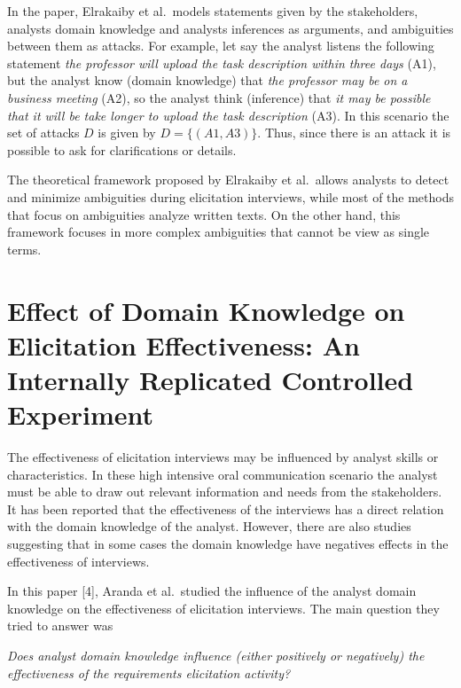 \documentclass[]{llncs}
\begin{document}
In the paper, Elrakaiby et al.~models statements given by the
stakeholders, analysts domain knowledge and analysts inferences as
arguments, and ambiguities between them as attacks. For example, let say
the analyst listens the following statement \emph{the professor will
upload the task description within three days} (A1), but the analyst
know (domain knowledge) that \emph{the professor may be on a business
meeting} (A2), so the analyst think (inference) that \emph{it may be
possible that it will be take longer to upload the task description}
(A3). In this scenario the set of attacks \(D\) is given by
\(D = \{(A1,A3)\}\). Thus, since there is an attack it is possible to
ask for clarifications or details.

The theoretical framework proposed by Elrakaiby et al.~allows analysts
to detect and minimize ambiguities during elicitation interviews, while
most of the methods that focus on ambiguities analyze written texts. On
the other hand, this framework focuses in more complex ambiguities that
cannot be view as single terms.

\hypertarget{effect-of-domain-knowledge-on-elicitation-effectiveness-an-internally-replicated-controlled-experiment}{%
\section{Effect of Domain Knowledge on Elicitation Effectiveness: An
Internally Replicated Controlled
Experiment}\label{effect-of-domain-knowledge-on-elicitation-effectiveness-an-internally-replicated-controlled-experiment}}

The effectiveness of elicitation interviews may be influenced by analyst
skills or characteristics. In these high intensive oral communication
scenario the analyst must be able to draw out relevant information and
needs from the stakeholders. It has been reported that the effectiveness
of the interviews has a direct relation with the domain knowledge of the
analyst. However, there are also studies suggesting that in some cases
the domain knowledge have negatives effects in the effectiveness of
interviews.

In this paper {[}4{]}, Aranda et al.~studied the influence of the
analyst domain knowledge on the effectiveness of elicitation interviews.
The main question they tried to answer was

\emph{Does analyst domain knowledge influence (either positively or
negatively) the effectiveness of the requirements elicitation activity?}
\end{document}
